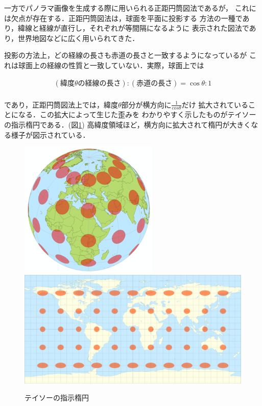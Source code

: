 一方でパノラマ画像を生成する際に用いられる正距円筒図法であるが，
これには欠点が存在する．正距円筒図法は，球面を平面に投影する
方法の一種であり，緯線と経線が直行し，それぞれが等間隔になるように
表示された図法であり，世界地図などに広く用いられてきた．

投影の方法上，どの経線の長さも赤道の長さと一致するようになっているが
これは球面上の経線の性質と一致していない．実際，球面上では

\begin{eqnarray}
  (緯度\theta の経線の長さ):(赤道の長さ)= \cos{\theta}:1 \nonumber \\
\end{eqnarray}

であり，正距円筒図法上では，緯度$\theta$部分が横方向に$\frac{1}{cos\theta}$だけ
拡大されていることになる．この拡大によって生じた歪みを
わかりやすく示したものがテイソーの指示楕円である．(図\ref{teiso})
高緯度領域ほど，横方向に拡大されて楕円が大きくなる様子が図示されている．

\begin{figure}[tbp]
  \centering
  \includegraphics[scale=1.0]{fig/teiso1.png}
  \includegraphics[scale=0.2]{fig/teiso2.png}
  \caption{テイソーの指示楕円\cite{20}}\label{teiso}
\end{figure}

